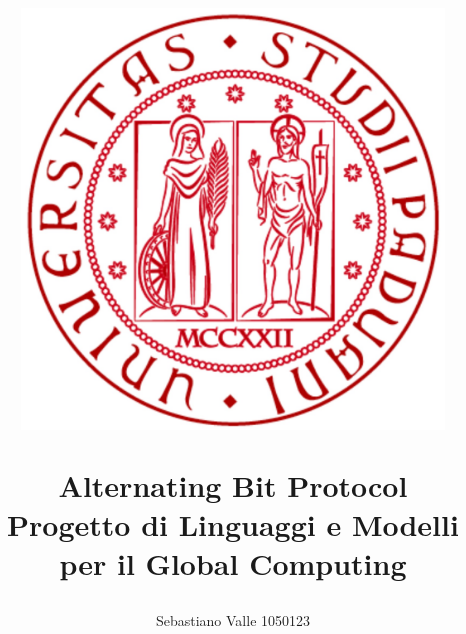\documentclass[
article,
10pt, %
oneside, %
BCOR5mm, %
]{scrartcl}
\begin{document}
\begin{center}
\title{
  \begin{figure}[h!]
  \centering
  \includegraphics[width=.3\columnwidth]{images/logo_padova.jpg}
  \end{figure}
  Alternating Bit Protocol \\
  \vspace{2cm}
  Progetto di \textbf{Linguaggi e Modelli per il Global Computing}
}
\author{
Sebastiano Valle 1050123}
\end{center} %









\maketitle %

\setcounter{page}{1} %


\raggedright{}
\newpage{}
\tableofcontents %



\listoffigures %


\appendix



\newpage %
\end{document}
